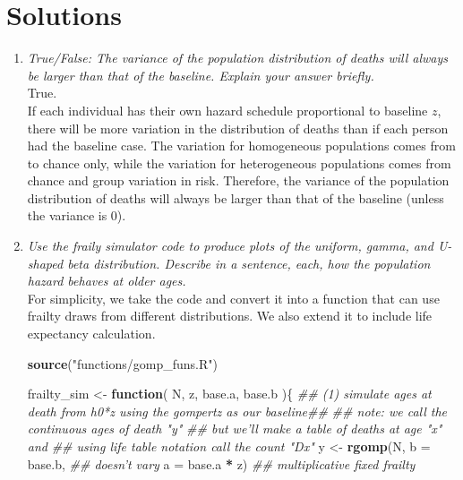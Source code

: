 \documentclass[]{book}
\newenvironment{Shaded}{\begin{snugshade}}{\end{snugshade}}
\newcommand{\CommentTok}[1]{\textcolor[rgb]{0.56,0.35,0.01}{\textit{#1}}}
\newcommand{\ControlFlowTok}[1]{\textcolor[rgb]{0.13,0.29,0.53}{\textbf{#1}}}
\newcommand{\DataTypeTok}[1]{\textcolor[rgb]{0.13,0.29,0.53}{#1}}
\newcommand{\KeywordTok}[1]{\textcolor[rgb]{0.13,0.29,0.53}{\textbf{#1}}}
\newcommand{\NormalTok}[1]{#1}
\newcommand{\OperatorTok}[1]{\textcolor[rgb]{0.81,0.36,0.00}{\textbf{#1}}}
\newcommand{\StringTok}[1]{\textcolor[rgb]{0.31,0.60,0.02}{#1}}
\begin{document}
\hypertarget{solutions-1}{%
\section{Solutions}\label{solutions-1}}

\begin{enumerate}
\def\labelenumi{\arabic{enumi}.}
\item
  \emph{True/False: The variance of the population distribution of deaths will always be larger than that of the baseline. Explain your answer briefly.}\\
  True.\\
  If each individual has their own hazard schedule proportional to baseline \(z\), there will be more variation in the distribution of deaths than if each person had the baseline case. The variation for homogeneous populations comes from to chance only, while the variation for heterogeneous populations comes from chance and group variation in risk. Therefore, the variance of the population distribution of deaths will always be larger than that of the baseline (unless the variance is 0).\\
\item
  \emph{Use the fraily simulator code to produce plots of the uniform, gamma, and U-shaped beta distribution. Describe in a sentence, each, how the population hazard behaves at older ages.}\\
  For simplicity, we take the code and convert it into a function that can use frailty draws from different distributions. We also extend it to include life expectancy calculation.

\begin{Shaded}
\begin{Highlighting}[]
\KeywordTok{source}\NormalTok{(}\StringTok{"functions/gomp_funs.R"}\NormalTok{)}

\NormalTok{frailty_sim <-}\StringTok{ }\ControlFlowTok{function}\NormalTok{( N, z, base.a, base.b )\{}
  \CommentTok{## (1) simulate ages at death from h0*z  using the gompertz as our baseline##}
  \CommentTok{## note: we call the continuous ages of death "y"}
  \CommentTok{## but we'll make a table of deaths at age "x" and}
  \CommentTok{## using life table notation call the count "Dx"}
\NormalTok{  y <-}\StringTok{ }\KeywordTok{rgomp}\NormalTok{(N,}
       \DataTypeTok{b =}\NormalTok{ base.b, }\CommentTok{## doesn't vary}
       \DataTypeTok{a =}\NormalTok{ base.a }\OperatorTok{*}\StringTok{ }\NormalTok{z) }\CommentTok{## multiplicative fixed frailty}


\end{Highlighting}
\end{Shaded}
\end{enumerate}
\end{document}
